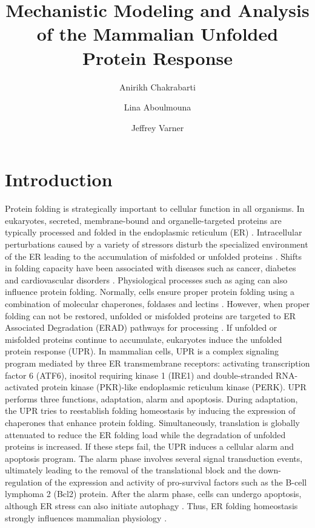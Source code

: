 \documentclass[fleqn,10pt]{wlscirep}
\title{Mechanistic Modeling and Analysis of the Mammalian Unfolded Protein Response}
\author[1]{Anirikh Chakrabarti}
\author[2]{Lina Aboulmouna}
\author[1,2,*]{Jeffrey Varner}
\affil[1]{Cornell University, School of Chemical and Biomolecular Engineering, Cornell University, Ithaca, NY 14853, USA}
\affil[2]{Purdue University, School of Chemical Engineering, West Lafayette, IN 47907, USA}
\affil[*]{jdv27@cornell.edu}
\begin{document}
\flushbottom
\maketitle

%
%
\thispagestyle{empty}


\section*{Introduction}
Protein folding is strategically important to cellular function in all organisms.
In eukaryotes, secreted, membrane-bound and organelle-targeted proteins are typically processed and folded in the endoplasmic reticulum (ER) \cite{naidoo2009er, ron2002translational, kaufman2002unfolded}.
Intracellular perturbations caused by a variety of stressors disturb the specialized environment of the ER leading to the accumulation of misfolded or unfolded proteins \cite{ellgaard2003qce,Fonseca:2009fk}.
Shifts in folding capacity have been associated with diseases such as cancer, diabetes and cardiovascular disorders \cite{ellgaard2003qce}. Physiological processes such as aging can also influence protein folding.
Normally, cells ensure proper protein folding using a combination of molecular chaperones, foldases and lectins \cite{naidoo2009er}.
However, when proper folding can not be restored, unfolded or misfolded proteins are targeted to ER Associated Degradation (ERAD) pathways for processing \cite{kaufman2002unfolded}.
If unfolded or misfolded proteins continue to accumulate, eukaryotes induce the unfolded protein response (UPR).
In mammalian cells, UPR is a complex signaling program mediated by three ER transmembrane receptors: activating transcription factor 6 (ATF6), inositol requiring kinase 1 (IRE1) and double-stranded RNA-activated protein kinase (PKR)-like endoplasmic reticulum kinase (PERK).
UPR performs three functions, adaptation, alarm and apoptosis. During adaptation, the UPR tries to reestablish folding homeostasis by inducing the expression of chaperones that enhance protein folding.
Simultaneously, translation is globally attenuated to reduce the ER folding load while the degradation of unfolded proteins is increased. If these steps fail, the UPR induces a cellular alarm and apoptosis program.
The alarm phase involves several signal transduction events, ultimately leading to the removal of the translational block and the down-regulation of the expression and activity of pro-survival factors such as the B-cell lymphoma 2 (Bcl2) protein.
After the alarm phase, cells can undergo apoptosis, although ER stress can also initiate autophagy \cite{ogata2006aac, yorimitsu2006ers, bernales2006ace, kamimoto2006iic, hoyerhansen2007cmc, kouroku2006esp, fujita2007ter}.
Thus, ER folding homeostasis strongly influences mammalian physiology \cite{Fonseca:2009fk}.
\end{document}
